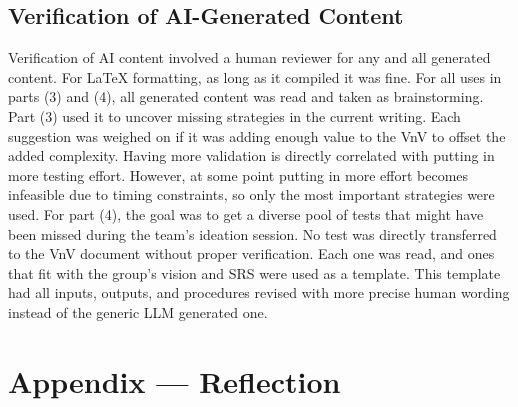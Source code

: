 \documentclass[12pt, titlepage]{article}
\begin{document}
\subsection{Verification of AI-Generated Content}
Verification of AI content involved a human reviewer for any and all generated 
content. For LaTeX formatting, as long as it compiled it was fine. For all 
uses in parts (3) and (4), all generated content was read and taken as 
brainstorming. Part (3) used it to uncover missing strategies in the current 
writing. Each suggestion was weighed on if it was adding enough value to the 
VnV to offset the added complexity. Having more validation is directly 
correlated with putting in more testing effort. However, at some point 
putting in more effort becomes infeasible due to timing constraints, 
so only the most important strategies were used. For part (4), the goal was 
to get a diverse pool of tests that might have been missed during the team's 
ideation session. No test was directly transferred to the VnV document without 
proper verification. Each one was read, and ones that fit with the group's 
vision and SRS were used as a template. This template had all inputs, outputs, 
and procedures revised with more precise human wording instead of the generic 
LLM generated one.

\clearpage

\section{Appendix --- Reflection}


\end{document}
